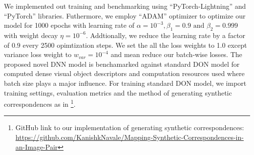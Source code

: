 We implemented out training and benchmarking using ``PyTorch-Lightning''\cite{falcon2019pytorch} and ``PyTorch''\cite{paszke2019pytorch} libraries.
Futhermore, we employ
``ADAM''\cite{kingma2014adam} optimizer to optimize our model for 1000 epochs with learning rate of
$\alpha = 10^{-3}, \beta_1 = 0.9 \text{ and } \beta_2 = 0.999$ with weight decay $\eta =10^{-6}$.
Addtionally, we reduce the learning rate by a factor of $0.9$ every 2500 opimtization steps.
We set the all the loss weights to 1.0 except variance loss weight to $w_{var} = 10^{-4}$ and mean reduce our batch-wise losses.
The proposed novel DNN model is benchamarked against standard DON model for computed dense visual object descriptors and
computation resources used where batch size plays a major influence.
For training standard DON model, we import training settings, evaluation
metrics and the method of generating synthetic correspondences as in
\cite{adrian2022efficient}\footnote{GitHub link to our implementation of generating synthetic correspondences: \url{https://github.com/KanishkNavale/Mapping-Synthetic-Correspondences-in-an-Image-Pair}}.
